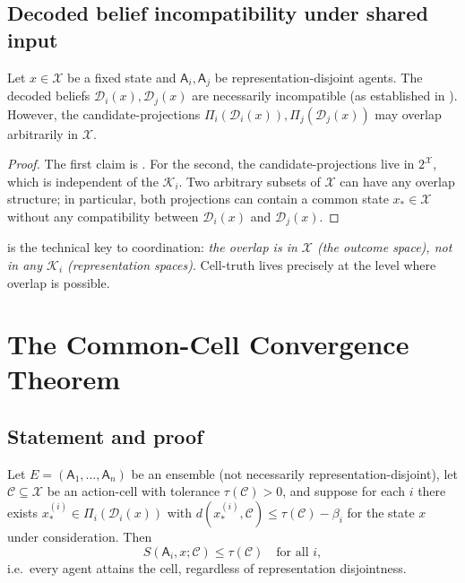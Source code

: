 \documentclass[11pt,twocolumn,a4paper]{article}
\newcommand{\K}{\mathcal{K}}
\newcommand{\D}{\mathcal{D}}
\newcommand{\X}{\mathcal{X}}
\newcommand{\Cell}{\mathcal{C}}
\newcommand{\agent}{\mathsf{A}}
\begin{document}
\subsection{Decoded belief incompatibility under shared input}

\begin{theorem}\label{thm:identical}
Let $x\in\X$ be a fixed state and $\agent_i,\agent_j$ be
representation-disjoint agents. The decoded beliefs $\D_i(x),\D_j(x)$
are necessarily incompatible (as established in
). However, the candidate-projections
$\Pi_i(\D_i(x)),\Pi_j(\D_j(x))$ may overlap arbitrarily in $\X$.
\end{theorem}

\begin{proof}
The first claim is . For the second, the
candidate-projections live in $2^\X$, which is independent of the
$\K_i$. Two arbitrary subsets of $\X$ can have any overlap structure;
in particular, both projections can contain a common state $x_*\in\X$
without any compatibility between $\D_i(x)$ and $\D_j(x)$.
\end{proof}

\begin{remark}\label{rem:cell-key}
 is the technical key to coordination: \emph{the
overlap is in $\X$ (the outcome space), not in any $\K_i$
(representation spaces)}. Cell-truth lives precisely at the level
where overlap is possible.
\end{remark}

\section{The Common-Cell Convergence Theorem}
\label{sec:ccc}

\subsection{Statement and proof}

\begin{theorem}\label{thm:ccc}
Let $E=(\agent_1,\dots,\agent_n)$ be an ensemble (not necessarily
representation-disjoint), let $\Cell\subseteq\X$ be an action-cell with
tolerance $\tau(\Cell)>0$, and suppose for each $i$ there exists
$x_*^{(i)}\in\Pi_i(\D_i(x))$ with $d(x_*^{(i)},\Cell)\le\tau(\Cell)
-\beta_i$ for the state $x$ under consideration. Then
\[
S(\agent_i,x;\Cell)\le\tau(\Cell)\quad\text{for all }i,
\]
i.e.\ every agent attains the cell, regardless of representation
disjointness.
\end{theorem}
\end{document}
